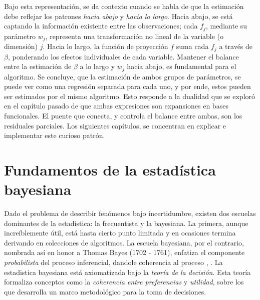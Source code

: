 \documentclass[../Main/Main.tex]{subfiles}
\begin{document}
Bajo esta representación, se da contexto cuando se habla de que la estimación debe reflejar los patrones \textit{hacia abajo} y \textit{hacia lo largo}. Hacia abajo, se está captando la información existente entre las observaciones;  cada $f_j$, mediante su parámetro $w_j$, representa una transformación no lineal de la variable (o dimensión) $j$. Hacia lo largo, la función de proyección $f$ suma cada $f_j$ a través de $\beta$, ponderando los efectos individuales de cada variable. Mantener el balance entre la estimación de $\beta$ a lo largo y $w_j$ hacia abajo, es fundamental para el algoritmo. Se concluye, que la estimación de ambos grupos de parámetros, se puede ver como una regresión separada para cada uno, y por ende, estos pueden ser estimados por el mismo algoritmo. Esto responde a la dualidad que se exploró en el capítulo pasado de que ambas expresiones son expansiones en bases funcionales. El puente que conecta, y controla el balance entre ambas, son los residuales parciales. Los siguientes capítulos, se concentran en explicar e implementar este curioso patrón. 

\section{Fundamentos de la estadística bayesiana}
Dado el problema de describir fenómenos bajo incertidumbre, existen dos escuelas dominantes de la estadística: la frecuentista y la bayesiana. La primera, aunque increíblemente útil, está hasta cierto punto limitada y en ocasiones termina derivando en colecciones de algoritmos. La escuela bayesiana, por el contrario, nombrada así en honor a Thomas Bayes (1702 - 1761), enfatiza el componente \textit{probabilista} del proceso inferencial, dandole coherencia al proceso \autocite{mendoza2011estadistica}, \autocite{bernardo2001bayesian}. La estadistica bayesiana está  axiomatizada bajo la \textit{teoría de la decisión}. Esta teoría formaliza conceptos como la \textit{coherencia entre preferencias} y \textit{utilidad}, sobre los que desarrolla un marco metodológico para la toma de decisiones. 
\end{document}
